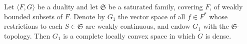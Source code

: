 Let $\langle F, G \rangle$ be a duality and let $\mathfrak{S}$ be a saturated family, covering $F$, of weakly bounded subsets of $F$. Denote by $G_1$ the vector space of all $f \in F^*$ whose restrictions to each $S \in \mathfrak{S}$ are weakly continuous, and endow $G_1$ with the $\mathfrak{S}$-topology. Then $G_1$ is a complete locally convex space in which $G$ is dense.